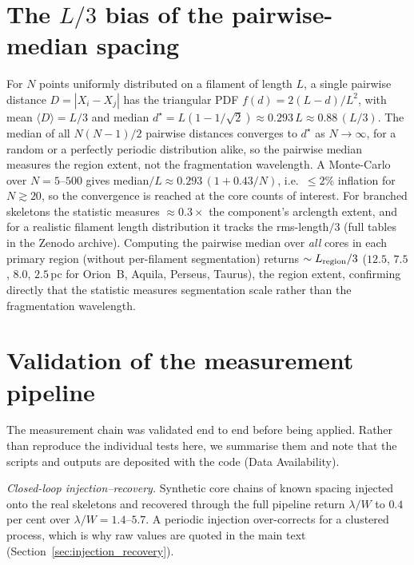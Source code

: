\documentclass[usenatbib,twoside,twocolumn]{mnras}
\begin{document}
\section{The $L/3$ bias of the pairwise-median spacing}
\label{sec:pwmedian}
For $N$ points uniformly distributed on a filament of length $L$, a single pairwise distance $D=|X_i-X_j|$ has the triangular PDF $f(d)=2(L-d)/L^2$, with mean $\langle D\rangle=L/3$ and median $d^\star=L(1-1/\sqrt{2})\approx0.293\,L\approx0.88\,(L/3)$. The median of all $N(N-1)/2$ pairwise distances converges to $d^\star$ as $N\to\infty$, for a random or a perfectly periodic distribution alike, so the pairwise median measures the region extent, not the fragmentation wavelength. A Monte-Carlo over $N=5$--$500$ gives median$/L\approx0.293\,(1+0.43/N)$, i.e.\ $\le2\%$ inflation for $N\gtrsim20$, so the convergence is reached at the core counts of interest. For branched skeletons the statistic measures $\approx0.3\times$ the component's arclength extent, and for a realistic filament length distribution it tracks the rms-length$/3$ (full tables in the Zenodo archive). Computing the pairwise median over \emph{all} cores in each primary region (without per-filament segmentation) returns $\sim L_{\rm region}/3$ ($12.5$, $7.5$, $8.0$, $2.5$\,pc for Orion~B, Aquila, Perseus, Taurus), the region extent, confirming directly that the statistic measures segmentation scale rather than the fragmentation wavelength.

\section{Validation of the measurement pipeline}
\label{sec:validation}

The measurement chain was validated end to end before being applied. Rather than reproduce the individual tests here, we summarise them and note that the scripts and outputs are deposited with the code (Data Availability).

\emph{Closed-loop injection--recovery.} Synthetic core chains of known spacing injected onto the real skeletons and recovered through the full pipeline return $\lambda/W$ to $0.4$ per cent over $\lambda/W=1.4$--$5.7$. A periodic injection over-corrects for a clustered process, which is why raw values are quoted in the main text (Section~\ref{sec:injection_recovery}).
\end{document}
